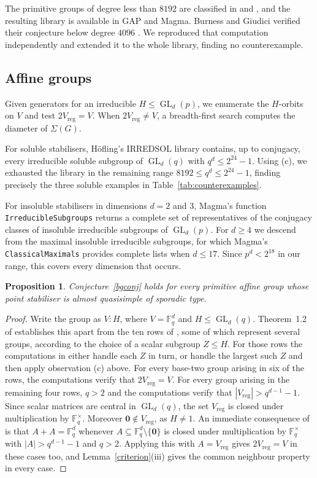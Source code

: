 \documentclass[a4paper,reqno,11pt]{amsart}
\newcommand\F{\mathbb{F}}
\newcommand\GL{\operatorname{GL}}
\newtheorem{prop}[thm]{Proposition}
\numberwithin{equation}{section}
\begin{document}
The primitive groups of degree less than $8192$ are classified in \cite{CQRD} and \cite{St}, and the resulting library is available in GAP and Magma. Burness and Giudici verified their conjecture below degree $4096$ \cite[Section~4]{BG}. We reproduced that computation independently and extended it to the whole library, finding no counterexample.

\subsection{Affine groups}

Given generators for an irreducible $H\le\GL_d(p)$, we enumerate the $H$-orbits on $V$ and test $2V_{\mathrm{reg}}=V$. When $2V_{\mathrm{reg}}\ne V$, a breadth-first search computes the diameter of $\Sigma(G)$.

For soluble stabilisers, H\"ofling's IRREDSOL library \cite{Hof} contains, up to conjugacy, every irreducible soluble subgroup of $\GL_d(q)$ with $q^d\le2^{24}-1$. Using (c), we exhausted the library in the remaining range $8192\le q^d\le2^{24}-1$, finding precisely the three soluble examples in Table~\ref{tab:counterexamples}.

For insoluble stabilisers in dimensions $d=2$ and $3$, Magma's function \texttt{IrreducibleSubgroups} returns a complete set of representatives of the conjugacy classes of insoluble irreducible subgroups of $\GL_d(p)$. For $d\ge4$ we descend from the maximal insoluble irreducible subgroups, for which Magma's \texttt{ClassicalMaximals} provides complete lists when $d\le17$. Since $p^d<2^{18}$ in our range, this covers every dimension that occurs.

\begin{prop}\label{prop:sporadic}
Conjecture~\ref{bgconj} holds for every primitive affine group whose point stabiliser is almost quasisimple of sporadic type.
\end{prop}

\begin{proof}
Write the group as $V{:}H$, where $V=\F_q^d$ and $H\le\GL_d(q)$. Theorem~1.2 of \cite{LP} establishes this apart from the ten rows of \cite[Table~1]{LP}, some of which represent several groups, according to the choice of a scalar subgroup $Z\le H$. For those rows the computations in \cite{AlunaAdam} either handle each $Z$ in turn, or handle the largest such $Z$ and then apply observation (c) above. For every base-two group arising in six of the rows, the computations verify that $2V_{\mathrm{reg}}=V$. For every group arising in the remaining four rows, $q>2$ and the computations verify that $|V_{\mathrm{reg}}|>q^{d-1}-1$. Since scalar matrices are central in $\GL_d(q)$, the set $V_{\mathrm{reg}}$ is closed under multiplication by $\F_q^\times$. Moreover $\mathbf0\notin V_{\mathrm{reg}}$, as $H\ne1$. An immediate consequence of \cite[Theorem~2]{DMP} is that $A+A=\F_q^d$ whenever $A\subseteq\F_q^d\setminus\{\mathbf0\}$ is closed under multiplication by $\F_q^\times$ with $|A|>q^{d-1}-1$ and $q > 2$. Applying this with $A=V_{\mathrm{reg}}$ gives $2V_{\mathrm{reg}}=V$ in these cases too, and Lemma~\ref{criterion}(iii) gives the common neighbour property in every case.
\end{proof}
\end{document}
